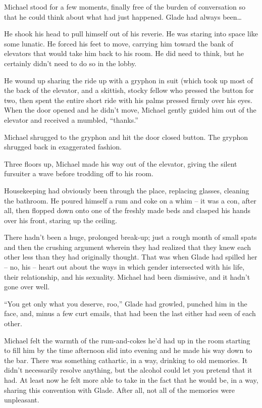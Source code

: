 Michael stood for a few moments, finally free of the burden of conversation so that he could think about what had just happened.  Glade had always been\ldots{}

He shook his head to pull himself out of his reverie.  He was staring into space like some lunatic.  He forced his feet to move, carrying him toward the bank of elevators that would take him back to his room.  He did need to think, but he certainly didn't need to do so in the lobby.

He wound up sharing the ride up with a gryphon in suit (which took up most of the back of the elevator, and a skittish, stocky fellow who pressed the button for two, then spent the entire short ride with his palms pressed firmly over his eyes.  When the door opened and he didn't move, Michael gently guided him out of the elevator and received a mumbled, ``thanks.''

Michael shrugged to the gryphon and hit the door closed button.  The gryphon shrugged back in exaggerated fashion.

Three floors up, Michael made his way out of the elevator, giving the silent fursuiter a wave before trodding off to his room.

Housekeeping had obviously been through the place, replacing glasses, cleaning the bathroom.  He poured himself a rum and coke on a whim -- it was a con, after all, then flopped down onto one of the freshly made beds and clasped his hands over his front, staring up the ceiling.

There hadn't been a huge, prolonged break-up; just a rough month of small spats and then the crushing argument wherein they had realized that they knew each other less than they had originally thought.  That was when Glade had spilled her -- no, his -- heart out about the ways in which gender intersected with his life, their relationship, and his sexuality.  Michael had been dismissive, and it hadn't gone over well.

``You get only what you deserve, roo,'' Glade had growled, punched him in the face, and, minus a few curt emails, that had been the last either had seen of each other.

\secdiv

Michael felt the warmth of the rum-and-cokes he'd had up in the room starting to fill him by the time afternoon slid into evening and he made his way down to the bar. There was something cathartic, in a way, drinking to old memories.  It didn't necessarily resolve anything, but the alcohol could let you pretend that it had.  At least now he felt more able to take in the fact that he would be, in a way, sharing this convention with Glade.  After all, not all of the memories were unpleasant.

